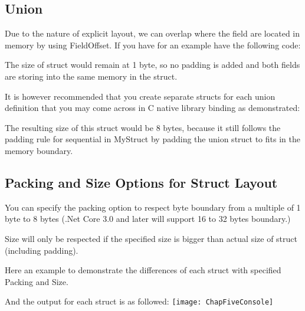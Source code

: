 \subsection{Union}
Due to the nature of explicit layout, we can overlap where the field are located in memory by using FieldOffset. If you have for an example have the following code:



The size of struct would remain at 1 byte, so no padding is added and both fields are storing into the same memory in the struct.

It is however recommended that you create separate structs for each union definition that you may come across in C native library binding as demonstrated:



The resulting size of this struct would be 8 bytes, because it still follows the padding rule for sequential in MyStruct by padding the union struct to fits in the memory boundary.

\subsection{Packing and Size Options for Struct Layout}
You can specify the packing option to respect byte boundary from a multiple of 1 byte to 8 bytes (.Net Core 3.0 and later will support 16 to 32 bytes boundary.)

Size will only be respected if the specified size is bigger than actual size of struct (including padding).

Here an example to demonstrate the differences of each struct with specified Packing and Size.


\newpage
And the output for each struct is as followed:
\newline \newline
\texttt{[image: ChapFiveConsole]}

